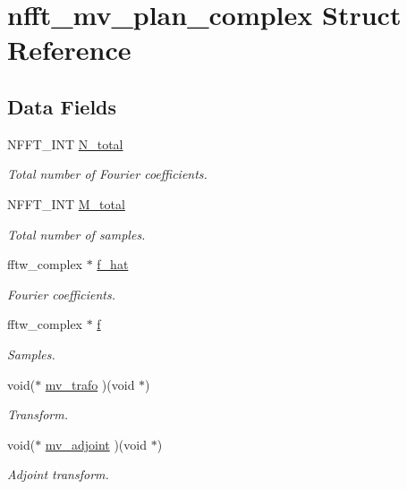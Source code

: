 \hypertarget{structnfft__mv__plan__complex}{\section{nfft\-\_\-mv\-\_\-plan\-\_\-complex Struct Reference}
\label{structnfft__mv__plan__complex}
}
\subsection*{Data Fields}
\begin{DoxyCompactItemize}
\item 
N\-F\-F\-T\-\_\-\-I\-N\-T \hyperlink{structnfft__mv__plan__complex_ac35a7817c4039590faed8eb76207e148}{N\-\_\-total}
\begin{DoxyCompactList}\small\item\em Total number of Fourier coefficients. \end{DoxyCompactList}\item 
N\-F\-F\-T\-\_\-\-I\-N\-T \hyperlink{structnfft__mv__plan__complex_a2926a8de536d6d0425628404e26cc2e0}{M\-\_\-total}
\begin{DoxyCompactList}\small\item\em Total number of samples. \end{DoxyCompactList}\item 
fftw\-\_\-complex $\ast$ \hyperlink{structnfft__mv__plan__complex_a391146cff1e8fc3cb981bbbf806ede52}{f\-\_\-hat}
\begin{DoxyCompactList}\small\item\em Fourier coefficients. \end{DoxyCompactList}\item 
fftw\-\_\-complex $\ast$ \hyperlink{structnfft__mv__plan__complex_a84fdb468f61a2f2a135d41ae0da1692e}{f}
\begin{DoxyCompactList}\small\item\em Samples. \end{DoxyCompactList}\item 
void($\ast$ \hyperlink{structnfft__mv__plan__complex_a56bf298c03c4aaeb6b4aaf7ed5cca57e}{mv\-\_\-trafo} )(void $\ast$)
\begin{DoxyCompactList}\small\item\em Transform. \end{DoxyCompactList}\item 
void($\ast$ \hyperlink{structnfft__mv__plan__complex_add14030aae4920f7ca71ecf1efde00a3}{mv\-\_\-adjoint} )(void $\ast$)
\begin{DoxyCompactList}\small\item\em Adjoint transform. \end{DoxyCompactList}\end{DoxyCompactItemize}


